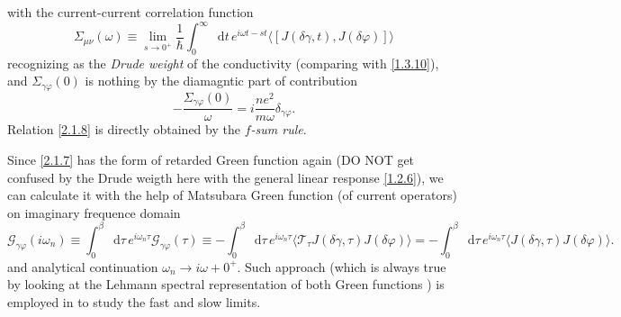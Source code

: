 \documentclass[10pt,nofootinbib,letterpaper]{revtex4}
\newcommand*\dd{\mathop{}\!\mathrm{d}}
\begin{document}
		with the current-current correlation function
		\begin{equation}\label{2.1.7}
			\Sigma_{\mu\nu}(\omega)\equiv\lim_{s \rightarrow0^+}\dfrac{1}{\hbar}\int_0^\infty\dd t\, e^{i\omega t-st}\langle[J(\delta\gamma,t),J(\delta\varphi)]\rangle
		\end{equation}
		recognizing as the \emph{Drude weight} of the conductivity (comparing with \eqref{1.3.10}), and $\Sigma_{\gamma\varphi}(0)$ is nothing by the diamagntic part of contribution
		\begin{equation}\label{2.1.8}
			-\dfrac{\Sigma_{\gamma\varphi}(0)}{\omega}=i\dfrac{ne^2}{m\omega}\delta_{\gamma\varphi}.
		\end{equation}
		Relation \eqref{2.1.8} is directly obtained by the \emph{$f$-sum rule}.\par
		Since \eqref{2.1.7} has the form of retarded Green function again (DO NOT get confused by the Drude weigth here with the general linear response \eqref{1.2.6}), we can calculate it with the help of Matsubara Green function (of current operators) on imaginary frequence domain
		\begin{equation*}
			\mathcal{G}_{\gamma\varphi}(i\omega_n)\equiv\int_0^\beta\dd\tau\,e^{i\omega_n\tau}\mathcal{G}_{\gamma\varphi}(\tau)\equiv-\int_0^\beta\dd\tau\,e^{i\omega_n\tau}\langle\mathcal{T}_\tau J(\delta\gamma,\tau) J(\delta\varphi)\rangle=-\int_0^\beta\dd\tau\,e^{i\omega_n\tau}\langle J(\delta\gamma,\tau) J(\delta\varphi)\rangle.
		\end{equation*}
		and analytical continuation $\omega_n \rightarrow i\omega+0^+$. Such approach (which is always true by looking at the Lehmann spectral representation of both Green functions \cite{mahanmany}) is employed in \cite{scalapino1993insulator} to study the fast and slow limits.


\end{document}
